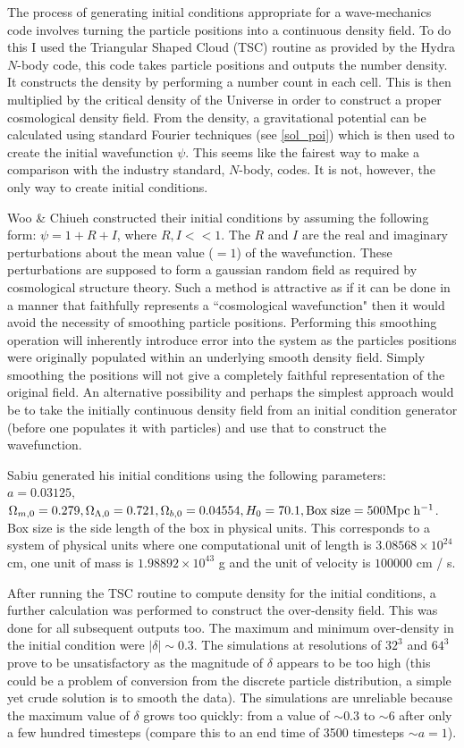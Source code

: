 The process of generating initial conditions appropriate for a wave-mechanics code involves turning the particle positions into a continuous density field. To do this I used the Triangular Shaped Cloud (TSC) routine as provided by the Hydra $N$-body code, this code takes particle positions and outputs the number density. It constructs the density by performing a number count in each cell. This is then multiplied by the critical density of the Universe in order to construct a proper cosmological density field. From the density, a gravitational potential can be calculated using standard Fourier techniques (see \ref{sol_poi}) which is then used to create the initial wavefunction $\psi$. This seems like the fairest way to make a comparison with the industry standard, $N$-body, codes. It is not, however, the only way to create initial conditions.

Woo \& Chiueh \citep{bib_woo, bib_wooc} constructed their initial conditions by assuming the following form: $\psi = 1 + R + I$, where $R, I << 1$. The $R$ and $I$ are the real and imaginary perturbations about the mean value ($ = 1$) of the wavefunction. These perturbations are supposed to form a gaussian random field as required by cosmological structure theory. Such a method is attractive as if it can be done in a manner that faithfully represents a ``cosmological wavefunction" then it would avoid the necessity of smoothing particle positions. Performing this smoothing operation will inherently introduce error into the system as the particles positions were originally populated within an underlying smooth density field. Simply smoothing the positions will not give a completely faithful representation of the original field. An alternative possibility and perhaps the simplest approach would be to take the initially continuous density field from an initial condition generator (before one populates it with particles) and use that to construct the wavefunction.

Sabiu generated his initial conditions using the following parameters: $a = 0.03125,$ $\Omega_{m,0} = 0.279, \Omega_{\Lambda,0} = 0.721, \Omega_{b,0} = 0.04554, H_0 = 70.1, {\rm Box \; size} = 500 {\rm Mpc \; h^{-1}}$. Box size is the side length of the box in physical units. This corresponds to a system of physical units where one computational unit of length is $3.08568\times 10^{24}$ cm, one unit of mass is $1.98892\times 10^{43}$ g and the unit of velocity is $100000$ cm / s.

After running the TSC routine to compute density for the initial conditions, a further calculation was performed to construct the over-density field. This was done for all subsequent outputs too. The maximum and minimum over-density in the initial condition were $|\delta| \sim 0.3 $. The simulations at resolutions of $32^3$ and $64^3$ prove to be unsatisfactory as the magnitude of $\delta$ appears to be too high (this could be a problem of conversion from the discrete particle distribution, a simple yet crude solution is to smooth the data). The simulations are unreliable because the maximum value of $\delta$ grows too quickly: from a value of $\sim 0.3$ to $\sim 6$ after only a few hundred timesteps (compare this to an end time of 3500 timesteps $\sim a = 1$).

